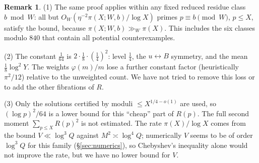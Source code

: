 \documentclass[11pt,reqno]{amsart}
\theoremstyle{definition}
\newtheorem{remark}[theorem]{Remark}
\begin{document}
\begin{remark}\label{rem:C}
(1) The same proof applies within any fixed reduced residue class $b\bmod
W$: all but $O_W(\eta^{-2}\pi(X;W,b)/\log X)$ primes $p\equiv b\pmod W$, $p\le X$,
satisfy the bound, because $\pi(X;W,b)\gg_W\pi(X)$.  This includes the
six classes modulo $840$ that contain all potential counterexamples.

(2) The constant $\frac1{64}$ is $2\cdot\frac18\cdot(\frac14)^2$: level
$\frac14$, the $u\leftrightarrow B$ symmetry, and the mean $\frac18\log^2Y$.
The weights $\varphi(m)/m$ lose a further constant factor (heuristically
$\pi^2/12$) relative to the unweighted count.  We have not tried to
remove this loss or to add the other fibrations of $R$.

(3) Only the solutions certified by moduli $\le X^{1/4-o(1)}$ are used,
so $(\log p)^2/64$ is a lower bound for this ``cheap'' part of $R(p)$.
The full second moment $\sum_{p\le X}R(p)^2$ is not estimated.  The rate
$\pi(X)/\log X$ comes from the bound $V\ll\log^3Q$ against
$M^2\asymp\log^4Q$; numerically $V$ seems to be of order $\log^3Q$ for
this family (\S\ref{sec:numerics}), so Chebyshev's inequality alone would
not improve the rate, but we have no lower bound for $V$.
\end{remark}
\end{document}
